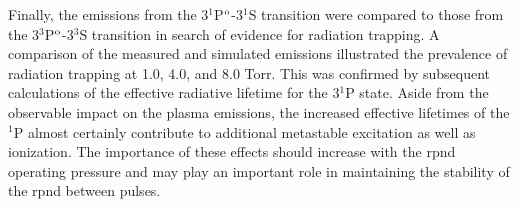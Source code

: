 Finally, the emissions from the 3$^1$P$^\mathrm{o}$-3$^1$S transition were compared to
those from the 3$^3$P$^\mathrm{o}$-3$^3$S transition in search of evidence for
radiation trapping. A comparison of the measured and simulated emissions
illustrated the prevalence of radiation trapping at 1.0, 4.0, and 8.0 Torr. This
was confirmed by subsequent calculations of the effective radiative lifetime for
the 3$^1$P state. Aside from the observable impact on the plasma emissions,
the increased effective lifetimes of the $^1$P almost certainly contribute to
additional metastable excitation as well as ionization. The importance of these
effects should increase with the \acs{rpnd} operating pressure and may play an
important role in maintaining the stability of the \acs{rpnd} between pulses.

